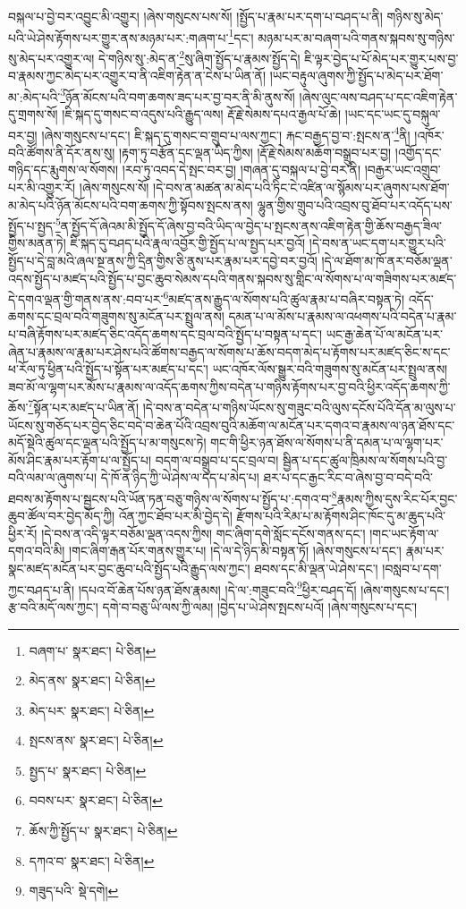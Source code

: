 བསྐལ་པ་བྱེ་བར་འབྱུང་མི་འགྱུར། །ཞེས་གསུངས་པས་སོ། །སྤྱོད་པ་རྣམ་པར་དག་པ་བཤད་པ་ནི། གཉིས་སུ་མེད་པའི་ཡེ་ཤེས་རྟོགས་པར་གྱུར་ནས་མཉམ་པར་:གཞག་པ་\footnote{བཞག་པ་  སྣར་ཐང་།  པེ་ཅིན། }དང་། མཉམ་པར་མ་བཞག་པའི་གནས་སྐབས་སུ་གཉིས་སུ་མེད་པར་འགྱུར་ལ། དེ་གཉིས་སུ་:མེད་ན་\footnote{མེད་ནས་  སྣར་ཐང་།  པེ་ཅིན། }སུ་ཞིག་སྤྱོད་པ་རྣམས་སྤྱོད་དེ། ཇི་ལྟར་བྱེད་པ་པོ་མེད་པར་གྱུར་པས་བྱ་བ་རྣམས་ཀྱང་མེད་པར་འགྱུར་བ་ནི་འཇིག་རྟེན་ན་ངེས་པ་ཡིན་ནོ། །ཡང་བརྟུལ་ཞུགས་ཀྱི་སྤྱོད་པ་མེད་པར་ཐོག་མ་:མེད་པའི་\footnote{མེད་པར་  སྣར་ཐང་།  པེ་ཅིན། }ཉོན་མོངས་པའི་བག་ཆགས་ཟད་པར་བྱ་བར་ནི་མི་ནུས་སོ། །ཞེས་ལུང་ལས་བཤད་པ་དང་འཇིག་རྟེན་དུ་གྲགས་སོ། །ཇི་སྐད་དུ་གསང་བ་འདུས་པའི་རྒྱུད་ལས། རྡོ་རྗེ་སེམས་དཔའ་རྒྱལ་པོ་ཆེ། །ཡང་དང་ཡང་དུ་བསྐུལ་བར་བྱ། །ཞེས་གསུངས་པ་དང་། ཇི་སྐད་དུ་གསང་བ་གྲུབ་པ་ལས་ཀྱང་། རྐང་བརྒྱད་བྱ་བ་:སྤངས་ན་\footnote{སྤངས་ནས་  སྣར་ཐང་།  པེ་ཅིན། }ནི། །འཁོར་བའི་ཚོགས་ནི་དོར་ནས་སུ། །རྟག་ཏུ་བརྩོན་དང་ལྡན་ཡིད་ཀྱིས། །རྡོ་རྗེ་སེམས་མཆོག་བསྒྲུབ་པར་བྱ། །འགྱོད་དང་གཉིད་དང་རྨུགས་ལ་སོགས། །རབ་ཏུ་འབད་དེ་སྤང་བར་བྱ། །གཞན་དུ་བསྐལ་པ་བྱེ་བར་ནི། །བརྒྱར་ཡང་འགྲུབ་པར་མི་འགྱུར་རོ། །ཞེས་གསུངས་སོ། །དེ་བས་ན་མཚན་མ་མེད་པའི་ཏིང་ངེ་འཛིན་ལ་སྙོམས་པར་ཞུགས་པས་ཐོག་མ་མེད་པའི་ཉོན་མོངས་པའི་བག་ཆགས་ཀྱི་སྟོབས་སྤངས་ནས། ལྷུན་གྱིས་གྲུབ་པའི་འབྲས་བུ་ཐོབ་པར་འདོད་པས་སྤྱོད་པ་སྤྱད་\footnote{སྤྱད་པ་  སྣར་ཐང་།  པེ་ཅིན། }ན་སྤྱོད་དོ་ཞེའམ་མི་སྤྱོད་དོ་ཞེས་བྱ་བའི་ཡིད་ལ་བྱེད་པ་སྤངས་ནས་འཇིག་རྟེན་གྱི་ཆོས་བརྒྱད་ཟིལ་གྱིས་མནན་ཏེ། ཇི་སྐད་དུ་བཤད་པའི་རྣལ་འབྱོར་གྱི་སྤྱོད་པ་ལ་སྤྱད་པར་བྱའོ། །དེ་བས་ན་ཡང་དག་པར་གྱུར་པའི་སྤྱོད་པ་དེ་བླ་མའི་ཞལ་སྔ་ནས་ཀྱི་དྲིན་གྱིས་ཅི་ནུས་པར་རྣམ་པར་དབྱེ་བར་བྱའོ། །དེ་ལ་ཐོག་མ་ཁོ་ནར་བཅོམ་ལྡན་འདས་སྤྱོད་པ་མཛད་པའི་སྤྱོད་པ་བྱང་ཆུབ་སེམས་དཔའི་གནས་སྐབས་སུ་གླིང་ལ་སོགས་པ་ལ་གཟིགས་པར་མཛད་དེ་དགའ་ལྡན་གྱི་གནས་ནས་:བབ་པར་\footnote{བབས་པར་  སྣར་ཐང་།  པེ་ཅིན། }མཛད་ནས་རྒྱུད་ལ་སོགས་པའི་ཚུལ་རྣམ་པ་བཞིར་བསྟན་ཏེ། འདོད་ཆགས་དང་བྲལ་བའི་གཟུགས་སུ་མངོན་པར་སྤྲུལ་ནས། དམན་པ་ལ་མོས་པ་རྣམས་ལ་འཕགས་པའི་བདེན་པ་རྣམ་པ་བཞི་རྟོགས་པར་མཛད་ཅིང་འདོད་ཆགས་དང་བྲལ་བའི་སྤྱོད་པ་བསྟན་པ་དང་། ཡང་རྒྱ་ཆེན་པོ་ལ་མངོན་པར་ཞེན་པ་རྣམས་ལ་རྣམ་པར་ཤེས་པའི་ཚོགས་བརྒྱད་ལ་སོགས་པ་ཆོས་བདག་མེད་པ་རྟོགས་པར་མཛད་ཅིང་ས་དང་ཕ་རོལ་ཏུ་ཕྱིན་པའི་སྤྱོད་པ་སྟོན་པར་མཛད་པ་དང་། ཡང་འཁོར་ལོས་སྒྱུར་བའི་གཟུགས་སུ་མངོན་པར་སྤྲུལ་ནས། ཟབ་མོ་ལ་ལྷག་པར་མོས་པ་རྣམས་ལ་འདོད་ཆགས་ཀྱིས་བདེན་པ་གཉིས་རྟོགས་པར་བྱ་བའི་ཕྱིར་འདོད་ཆགས་ཀྱི་ཆོས་\footnote{ཆོས་ཀྱི་སྤྱོད་པ་  སྣར་ཐང་།  པེ་ཅིན། }སྟོན་པར་མཛད་པ་ཡིན་ནོ། །དེ་བས་ན་བདེན་པ་གཉིས་ཡོངས་སུ་གཟུང་བའི་ལུས་དངོས་པོའི་དོན་མ་ལུས་པ་ཡོངས་སུ་གཅོད་པར་བྱེད་ཅིང་བདེ་བ་ཆེན་པོའི་འབྲས་བུའི་མཆོག་ལ་མངོན་པར་དགའ་བ་རྣམས་ལ་ཉན་ཐོས་དང་མདོ་སྡེའི་ཚུལ་དང་ལྡན་པའི་སྤྱོད་པ་མ་གསུངས་ཏེ། གང་གི་ཕྱིར་ཉན་ཐོས་ལ་སོགས་པ་ནི་དམན་པ་ལ་ལྷག་པར་མོས་ཤིང་རྣམ་པར་རྟོག་པ་ལ་སྤྱོད་པ། བདག་ལ་བསྒྲུབ་པ་དང་བྲལ་བ། སྦྱིན་པ་དང་ཚུལ་ཁྲིམས་ལ་སོགས་པའི་བྱ་བའི་ལམ་ལ་ཞུགས་པ། དེ་ཁོ་ན་ཉིད་ཀྱི་ཡེ་ཤེས་ལ་དད་པ་མེད་པ། ཐར་པ་དང་རྒྱང་རིང་བ་ཞེས་བྱ་བ་བདེ་བའི་ཐབས་མ་རྟོགས་པ་སྦྱངས་པའི་ཡོན་ཏན་བཅུ་གཉིས་ལ་སོགས་པ་སྤྱོད་པ་:དགའ་བ་\footnote{དཀའ་བ་  སྣར་ཐང་།  པེ་ཅིན། }རྣམས་ཀྱིས་དུས་རིང་པོར་བྱང་ཆུབ་ཚོལ་བར་བྱེད་མོད་ཀྱི། འོན་ཀྱང་ཐོབ་པར་མི་བྱེད་དེ། རྫོགས་པའི་རིམ་པ་མ་རྟོགས་ཤིང་ཁོང་དུ་མ་ཆུད་པའི་ཕྱིར་རོ། །དེ་བས་ན་འདི་ལྟར་བཅོམ་ལྡན་འདས་ཀྱིས། གང་ཞིག་དགེ་སློང་དངོས་གནས་དང་། །གང་ཡང་རྟོག་ལ་དགའ་བའི་མི། །གང་ཞིག་རྒན་པོར་གནས་གྱུར་པ། །དེ་ལ་དེ་ཉིད་མི་བསྟན་ཏོ། །ཞེས་གསུངས་པ་དང་། རྣམ་པར་སྣང་མཛད་མངོན་པར་བྱང་ཆུབ་པའི་སྤྱོད་པའི་རྒྱུད་ལས་ཀྱང་། ཐབས་དང་མི་ལྡན་ཡེ་ཤེས་དང་། །བསླབ་པ་དག་ཀྱང་བཤད་པ་ནི། །དཔའ་བོ་ཆེན་པོས་ཉན་ཐོས་རྣམས། །དེ་ལ་:གཟུང་བའི་\footnote{གཟུད་པའི་  སྡེ་དགེ། }ཕྱིར་བཤད་དོ། །ཞེས་གསུངས་པ་དང་། རྩ་བའི་མདོ་ལས་ཀྱང་། དགེ་བ་བཅུ་ཡི་ལས་ཀྱི་ལམ། །བྱེད་པ་ཡེ་ཤེས་སྤངས་པའོ། །ཞེས་གསུངས་པ་དང་། 